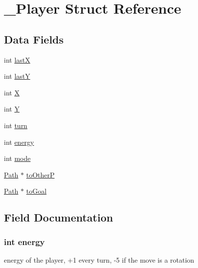 \hypertarget{struct___player}{}\section{\+\_\+\+Player Struct Reference}
\label{struct___player}
\subsection*{Data Fields}
\begin{DoxyCompactItemize}
\item 
int \hyperlink{struct___player_a7bb8b2cfc1aec0db2429c600cddccf17}{lastX}
\item 
int \hyperlink{struct___player_ae135df8cfc9b15d97e97b400a5cbc768}{lastY}
\item 
int \hyperlink{struct___player_a80c0944640e62d3ed6c5419c1bcc0c88}{X}
\item 
int \hyperlink{struct___player_aa482c4cc86a24474e4fb19b5b5978778}{Y}
\item 
int \hyperlink{struct___player_aaefa47f4fdf865c2358c22b542a993e4}{turn}
\item 
int \hyperlink{struct___player_a4ec8c7cb48771b844a6d50e2150e3f63}{energy}
\item 
int \hyperlink{struct___player_a1ea5d0cb93f22f7d0fdf804bd68c3326}{mode}
\item 
\hyperlink{struct_path}{Path} $\ast$ \hyperlink{struct___player_acb6bf1fa3b8884d0c9ce0b566a534bcc}{to\+OtherP}
\item 
\hyperlink{struct_path}{Path} $\ast$ \hyperlink{struct___player_ac7fee391a1ea765fcd9a813684459133}{to\+Goal}
\end{DoxyCompactItemize}


\subsection{Field Documentation}
\subsubsection[{\texorpdfstring{energy}{energy}}]{\setlength{\rightskip}{0pt plus 5cm}int energy}\hypertarget{struct___player_a4ec8c7cb48771b844a6d50e2150e3f63}{}\label{struct___player_a4ec8c7cb48771b844a6d50e2150e3f63}
energy of the player, +1 every turn, -\/5 if the move is a rotation 
